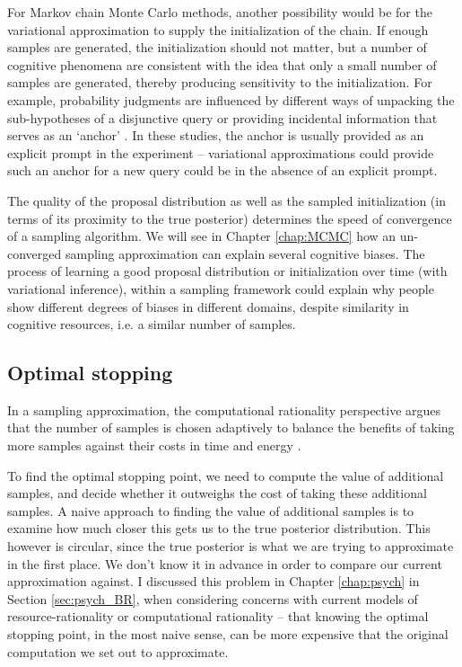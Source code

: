 For Markov chain Monte Carlo methods, another possibility would be for the variational approximation to supply the initialization of the chain. If enough samples are generated, the initialization should not matter, but a number of cognitive phenomena are consistent with the idea that only a small number of samples are generated\citep{vul2014one}, thereby producing sensitivity to the initialization. For example, probability judgments are influenced by different ways of unpacking the sub-hypotheses of a disjunctive query \citep{dasgupta2017hypotheses} or providing incidental information that serves as an `anchor' \citep{lieder2017anchoring,lieder2018empirical}. In these studies, the anchor is usually provided as an explicit prompt in the experiment -- variational approximations could provide such an anchor for a new query could be in the absence of an explicit prompt.

The quality of the proposal distribution as well as the sampled initialization (in terms of its proximity to the true posterior) determines the speed of convergence of a sampling algorithm\citep{holden1998geometric}. We will see in Chapter \ref{chap:MCMC} how an un-converged sampling approximation can explain several cognitive biases. The process of learning a good proposal distribution or initialization over time (with variational inference), within a sampling framework could explain why people show different degrees of biases in different domains, despite similarity in cognitive resources, i.e. a similar number of samples.

\subsection{Optimal stopping}
\label{sec:MCMC_optimal_stop}

In a sampling approximation, the computational rationality perspective argues that the number of samples is chosen adaptively to balance the benefits of taking more samples against their costs in time and energy \citep{Gershman2015,Vul2014,griffiths2015}. 

To find the optimal stopping point, we need to compute the value of additional samples, and decide whether it outweighs the cost of taking these additional samples. A naive approach to finding the value of additional samples is to examine how much closer this gets us to the true posterior distribution. This however is circular, since the true posterior is what we are trying to approximate in the first place. We don't know it in advance in order to compare our current approximation against. I discussed this problem in Chapter \ref{chap:psych} in Section \ref{sec:psych_BR}, when considering concerns with current models of resource-rationality or computational rationality -- that knowing the optimal stopping point, in the most naive sense, can be more expensive that the original computation we set out to approximate. 


